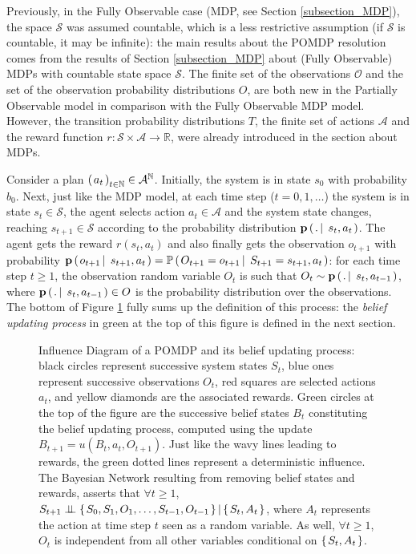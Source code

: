 Previously, in the Fully Observable case 
(MDP, see Section \ref{subsection_MDP}), 
the space $\mathcal{S}$ was assumed countable,
which is a less restrictive assumption 
(if $\mathcal{S}$ is countable, it may be infinite):
the main results about the POMDP resolution 
comes from the results of Section \ref{subsection_MDP} 
about (Fully Observable) MDPs 
with countable state space $\mathcal{S}$.
The finite set of the observations $\mathcal{O}$ 
and the set of the observation probability distributions $O$,
are both new in the Partially Observable model
in comparison with the Fully Observable MDP model. 
However, the transition probability distributions $T$,
the finite set of actions $\mathcal{A}$ 
and the reward function $r: \mathcal{S} \times \mathcal{A} \rightarrow \mathbb{R}$, 
were already introduced in the section about MDPs.

Consider a plan $\left( \left. a_t \right. \right)_{t \in \mathbb{N}} \in \mathcal{A}^{\mathbb{N}}$. 
Initially, the system is in state $s_0$ with probability $b_{0}$. 
Next, just like the MDP model, 
at each time step ($t=0,1,\ldots$) 
the system is in state $s_t \in \mathcal{S}$, 
the agent selects action $a_t \in \mathcal{A}$ 
and the system state changes,
reaching $s_{t+1} \in \mathcal{S}$ according to 
the probability distribution $\textbf{p} \left( \left.  . \, \right| \left. \, s_t , a_t \right. \right)$. 
The agent gets the reward $r(s_t,a_t)$ 
and also finally gets the observation $o_{t+1}$ 
with probability $\textbf{p} \left( \left.  o_{t+1} \, \right| \left. \, s_{t+1} , a_t  \right. \right) = \mathbb{P} \left( \left.  O_{t+1} = o_{t+1} \, \right| \left. \, S_{t+1} = s_{t+1}, a_t  \right. \right)$:
for each time step $t \geqslant 1$,
the observation random variable $O_t$
is such that $O_{t} \sim \textbf{p} \left( \left.  . \, \right| \left. \, s_{t} , a_{t-1}  \right. \right)$,
where $\textbf{p} \left( \left.  . \, \right| \left. \, s_{t} , a_{t-1}  \right. \right) \in O$ 
is the probability distribution over the observations.
The bottom of Figure \ref{POMDP} fully sums up the 
definition of this process: 
the \textit{belief updating process} 
in green at the top of this figure 
is defined in the next section.

\begin{figure}[!t]

\caption[Influence Diagram of a POMDP and its belief updating process]{
Influence Diagram of a POMDP and its belief updating process:
black circles represent successive system states $S_t$,
blue ones represent successive observations $O_t$,
red squares are selected actions $a_t$,
and yellow diamonds are the associated rewards.
Green circles at the top of the figure are the successive belief states 
$B_t$ constituting the belief updating process,
computed using the update $B_{t+1} = u(B_t,a_t,O_{t+1})$.
Just like the wavy lines leading to rewards, 
the green dotted lines represent a deterministic influence.
The Bayesian Network resulting from removing belief states and rewards, 
asserts that $\forall t \geqslant 1$, $S_{t+1} \perp\!\!\!\perp \left\{ \left.  S_{0},S_1, O_1, \ldots, S_{t-1}, O_{t-1}  \right. \right\} \vert \left\{ \left. S_t,A_t \right. \right\}$,
where $A_t$ represents the action at time step $t$ seen as a random variable.
As well, $\forall t \geqslant 1$, $O_{t}$ is independent from all other variables 
conditional on $\left\{ \left. S_t, A_t \right. \right\}$.}
\label{POMDP} 
\end{figure}

